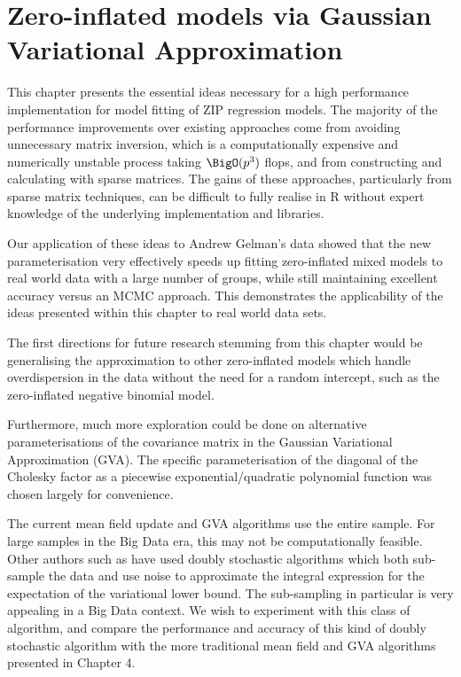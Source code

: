 \section{Zero-inflated models via Gaussian Variational Approximation }


This   chapter presents the essential ideas necessary for a high performance
implementation for model fitting of ZIP regression models.
The majority of the performance improvements over existing approaches come from
avoiding unnecessary matrix inversion, which is a computationally expensive
and numerically unstable process taking $\BigO(p^3)$ flops, and  from
constructing and calculating with sparse matrices. The gains of these
approaches, particularly from sparse  matrix techniques, can be difficult to
fully realise in R without expert knowledge of the underlying implementation
and libraries.

Our application of these ideas to Andrew Gelman's data showed that the new
parameterisation very effectively speeds up fitting zero-inflated mixed models
to real world data with a large number of groups, while still maintaining
excellent accuracy versus an MCMC approach. This demonstrates the applicability
of the ideas presented within this chapter to real world data sets.


The first directions for future research stemming from this chapter would be
generalising the approximation to other zero-inflated models which handle
overdispersion in the data without the need for a random intercept, such as the
zero-inflated negative binomial model.

Furthermore, much more exploration could be done on alternative
parameterisations of the covariance matrix in the Gaussian Variational
Approximation (GVA). The specific parameterisation of the diagonal of the Cholesky
factor as a piecewise exponential/quadratic polynomial function was chosen
largely for convenience.

The current mean field update and GVA algorithms
use the entire sample. For large samples in the Big Data era, this may not be
computationally feasible. Other authors such as \cite{Tan2018} have used doubly
stochastic algorithms which both sub-sample the data and use noise to
approximate the integral expression for the expectation of the variational
lower bound. The sub-sampling in particular is very appealing in a Big Data
context. We wish to experiment with this class of algorithm, and compare the
performance and accuracy of this kind of doubly stochastic algorithm with the
more traditional mean field and GVA algorithms presented in
Chapter 4.

